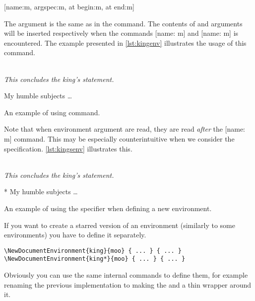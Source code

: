 \begin{lscommand}
  \small
  [name:m, argspec:m, at begin:m, at end:m]
\end{lscommand}
The  argument is the same as in the
 command. The contents of  and  arguments will be inserted respectively when the commands
[name: m] and [name: m] is encountered. The example
presented in \autoref{lst:kingenv} illustrates the usage of this command.
\begin{listing}
  \begin{example}
 {%
  \\[1em]%
  \emph{This concludes
    the king's statement.}%
}

\begin{king}
My humble subjects \ldots
\end{king}
\end{example}
  \caption{An example of using 
    command.}\label{lst:kingenv}
\end{listing}

Note that when environment argument are read, they are read \emph{after} the
[name: m] command. This may be especially counterintuitive when we
consider the  specification. \autoref{lst:kingsenv} illustrates this.
\begin{listing}
  \begin{example}
 {%
  \\[1em]%
  \emph{This concludes
    the king's statement.}%
}

\begin{king}*
My humble subjects \ldots
\end{king}
\end{example}
  \caption{An example of using the  specifier when defining a new
    environment.}\label{lst:kingsenv}
\end{listing}
If you want to create a starred version of an environment (similarly to some
 environments) you have to define it separately.
\begin{verbatim}
\NewDocumentEnvironment{king}{moo} { ... } { ... }
\NewDocumentEnvironment{king*}{moo} { ... } { ... }
\end{verbatim}
Obviously you can use the same internal commands to define them, for example
renaming the previous implementation to  making the
 and  a thin wrapper around it.

